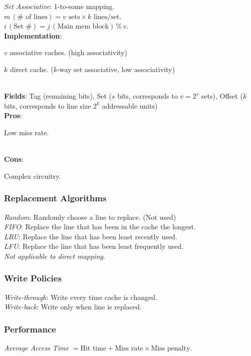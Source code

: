 \emph{Set Associative}: 1-to-some mapping.\\
$m \, (\#\text{ of lines}) = v \text{ sets} \times k \text{ lines/set}$.\\
$i \, (\text{Set \#}) = j \, (\text{Main mem block}) \, \%\, v$.\\
\textbf{Implementation}:
\begin{enuminline}
    \item $v$ associative caches. (high associativity)
    \item $k$ direct cache. ($k$-way set associative, low associativity)
\end{enuminline}\\
\textbf{Fields}: Tag (remaining bits), Set ($s$ bits, corresponds to $v=2^s$ sets), Offset ($k$ bits, corresponds to line size $2^k$ addressable units)\\
\textbf{Pros}:
\begin{enuminline}
    \item Low miss rate.
\end{enuminline}\\
\textbf{Cons}:
\begin{enuminline}
    \item Complex circuitry.
\end{enuminline}

\subsubsection*{Replacement Algorithms}
\emph{Random}: Randomly choose a line to replace. (Not used)\\
\emph{FIFO}: Replace the line that has been in the cache the longest.\\
\emph{LRU}: Replace the line that has been least recently used.\\
\emph{LFU}: Replace the line that has been least frequently used.\\
\textit{Not applicable to direct mapping}.

\subsubsection*{Write Policies}
\emph{Write-through}: Write every time cache is changed.\\
\emph{Write-back}: Write only when line is replaced.

\subsubsection*{Performance}
\emph{Average Access Time} $= \text{Hit time} + \text{Miss rate} \times \text{Miss penalty}$.

